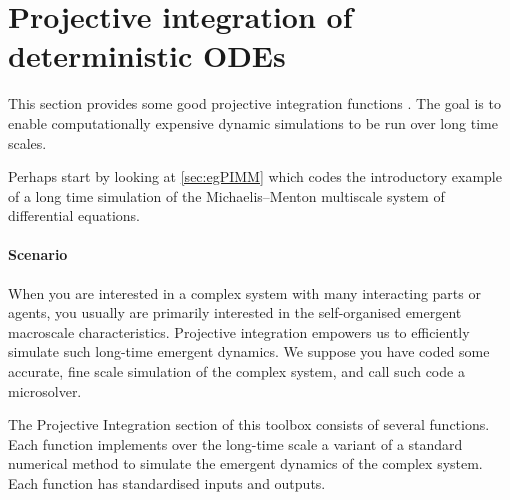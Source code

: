 \section{Projective integration of deterministic ODEs}
\label{sec:ProjInt}
\localtableofcontents

This section provides some good projective integration functions \cite[e.g.]{Gear02b, Gear03c, Givon06, Sieber2018}.
The goal is to enable computationally expensive dynamic simulations to be run over long time scales.
\begin{userExample} 
Perhaps start by looking at \cref{sec:egPIMM} which codes the introductory example of a long time simulation of the Michaelis--Menton multiscale system of differential equations.
\end{userExample}

\paragraph{Scenario}
When you are interested in a complex system with many interacting parts or agents, you usually are primarily interested in the self-organised emergent macroscale characteristics.
Projective integration empowers us to efficiently simulate such long-time emergent dynamics.
We suppose you have coded some accurate, fine scale simulation of the complex system, and call such code a microsolver.

The Projective Integration section of this toolbox consists of several functions.
Each function implements over the long-time scale a variant of a standard numerical method to simulate the emergent dynamics of the complex system.
Each function has standardised inputs and outputs.


